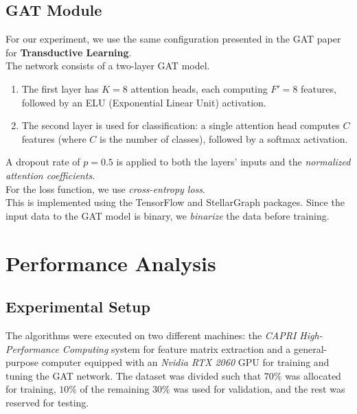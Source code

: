 \documentclass[12pt,conference]{ieeeconf} %
\begin{document}
\subsection{GAT Module}
For our experiment, we use the same configuration presented in the GAT paper for \textbf{Transductive Learning}. \\
The network consists of a two-layer GAT model. 
\begin{enumerate}
    \item The first layer has $K = 8$ attention heads, each computing $F' = 8$ features, followed by an ELU (Exponential Linear Unit) activation.
    \item The second layer is used for classification: a single attention head computes $C$ features (where $C$ is the number of classes), followed by a softmax activation.
\end{enumerate}
A dropout rate of $p = 0.5$ is applied to both the layers' inputs and the \textit{normalized attention coefficients}.\\
For the loss function, we use \textit{cross-entropy loss}. \\This is implemented using the TensorFlow and StellarGraph packages.
Since the input data to the GAT model is binary, we \textit{binarize} the data before training.

\section{Performance Analysis} 
\subsection{Experimental Setup}
The algorithms were executed on two different machines: the \textit{CAPRI High-Performance Computing} system for feature matrix extraction and a general-purpose computer equipped with an \textit{Nvidia RTX 2060} GPU for training and tuning the GAT network. The dataset was divided such that $70\%$ was allocated for training, $10\%$ of the remaining $30\%$ was used for validation, and the rest was reserved for testing.
\end{document}
